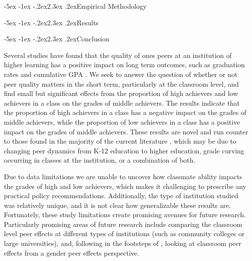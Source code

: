 \documentclass[12pt,a4paper,english,fleqn]{article}
\makeatletter
\renewcommand\section{\@startsection{section}{1}{\z@}
{-5ex \@plus -1ex \@minus -.2ex}{2.3ex \@plus.2ex}{\normalfont\large\bf}}
\makeatother
\begin{document}


\section{Empirical Methodology}\label{methods}



\section{Results}\label{results}



\section{Conclusion}\label{conclusion}


Several studies have found that the quality of ones peers at an institution of higher learning has a positive impact on long term outcomes, such as graduation rates and cumulative GPA \citep{smith2015new,luppino2015college,ost2010role}.
We seek to answer the question of whether or not peer quality matters in the short term, particularly at the classroom level, and find small but significant effects from the proportion of high achievers and low achievers in a class on the grades of middle achievers. 
The results indicate that the proportion of high achievers in a class has a negative impact on the grades of middle achievers, while the proportion of low achievers in a class has a positive impact on the grades of middle achievers. 
These results are novel and run counter to those found in the majority of the current literature \citep{kang2007classroom,carman2012classroom,burke2013classroom,schlosser2008inside,lavy2012good}, which may be due to changing peer dynamics from K-12 education to higher education, grade curving occurring in classes at the institution, or a combination of both.
 
Due to data limitations we are unable to uncover how classmate ability impacts the grades of high and low achievers, which makes it challenging to prescribe any practical policy recommendations.
Additionally, the type of institution studied was relatively unique, and it is not clear how generalizable these results are. 
Fortunately, these study limitations create promising avenues for future research.
Particularly promising areas of future research include comparing the classroom level peer effects at different types of institutions (such as community colleges or large universities), and, following in the footsteps of \citet{oosterbeek2014gender}, looking at classroom peer effects from a gender peer effects perspective.
       
\newpage{}
\pagestyle{plain}
\singlespacing


\end{document}
